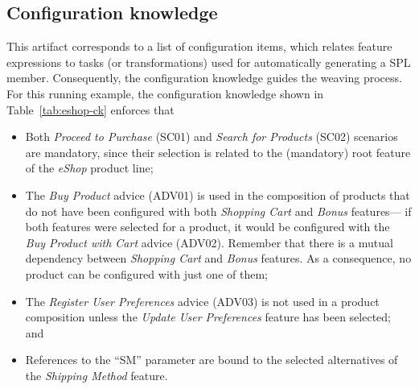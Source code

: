 \documentclass{sig-alternate}
\begin{document}
\subsection{Configuration knowledge}\label{sub:configuration-knowledge}

This artifact corresponds to a list of configuration items, which
relates feature expressions to tasks (or transformations) used for automatically generating a
SPL member. Consequently, the configuration knowledge guides the weaving
process. For this running example, the configuration knowledge shown in
Table~\ref{tab:eshop-ck} enforces that

\begin{itemize}
\item Both \emph{Proceed to Purchase} (SC01) and \emph{Search for Products}
(SC02) scenarios are mandatory, since their selection is related to the
(mandatory) root feature of the \emph{eShop} product line;

\item The \emph{Buy Product} advice (ADV01) is used in the composition of
products that do not have been configured with both \emph{Shopping Cart} and \emph{Bonus}
features--- if both features were selected for a product, it would be configured
with the \emph{Buy Product with Cart} advice (ADV02). Remember that there is a
mutual dependency between \emph{Shopping Cart} and \emph{Bonus} features. As a
consequence, no product can be configured with just one of them;

\item The \emph{Register User Preferences} advice (ADV03) is not used in a
product composition unless the \emph{Update User Preferences} feature has been
selected; and

\item References to the ``SM'' parameter are bound to the
selected alternatives of the \emph{Shipping Method} feature.

\end{itemize}
\end{document}
